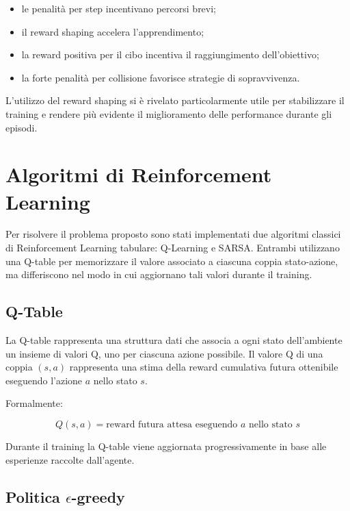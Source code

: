 \documentclass[12pt,a4paper]{report}
\begin{document}
\begin{itemize}
    \item le penalità per step incentivano percorsi brevi;
    \item il reward shaping accelera l’apprendimento;
    \item la reward positiva per il cibo incentiva il raggiungimento dell’obiettivo;
    \item la forte penalità per collisione favorisce strategie di sopravvivenza.
\end{itemize}

L’utilizzo del reward shaping si è rivelato particolarmente utile per stabilizzare il training e rendere più evidente il miglioramento delle performance durante gli episodi.

\chapter{Algoritmi di Reinforcement Learning}

Per risolvere il problema proposto sono stati implementati due algoritmi classici di Reinforcement Learning tabulare: Q-Learning e SARSA. Entrambi utilizzano una Q-table per memorizzare il valore associato a ciascuna coppia stato-azione, ma differiscono nel modo in cui aggiornano tali valori durante il training.

\section{Q-Table}

La Q-table rappresenta una struttura dati che associa a ogni stato dell’ambiente un insieme di valori Q, uno per ciascuna azione possibile. Il valore Q di una coppia $(s,a)$ rappresenta una stima della reward cumulativa futura ottenibile eseguendo l’azione $a$ nello stato $s$.

Formalmente:

\begin{equation}
Q(s,a) = \text{reward futura attesa eseguendo } a \text{ nello stato } s
\end{equation}

Durante il training la Q-table viene aggiornata progressivamente in base alle esperienze raccolte dall’agente.

\section{Politica \texorpdfstring{$\epsilon$}{epsilon}-greedy}
\end{document}
